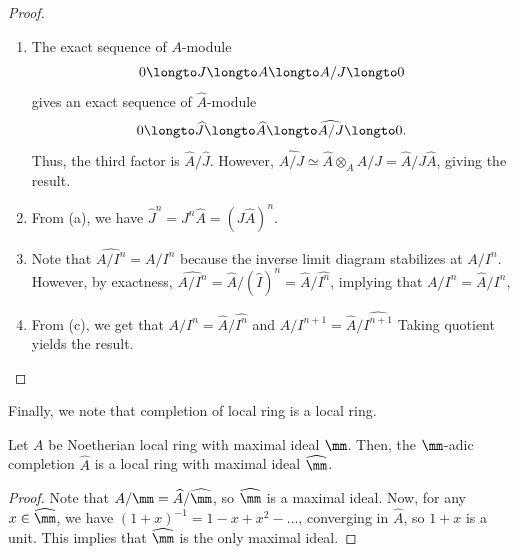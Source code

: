 \begin{proof}
    \begin{enumerate}[label=(\alph*)]
     \item The exact sequence of $A$-module
 	$$0\longto J\longto A\longto A/J\longto 0$$
 	gives an exact sequence of $\widehat A$-module
 	$$0\longto \widehat J\longto\widehat A
 	\longto\widehat{A/J} \longto 0.$$
 	Thus, the third factor is $\widehat A / \widehat J$.
        However, $\widehat{A/J} \simeq \widehat A\otimes_A A/J
        = \widehat A/J\widehat A$,
 	giving the result.
     \item From (a), we have $\widehat J^n = J^n\widehat A
 	= (J\widehat A)^n$.
     \item Note that $\widehat{A/I^n} = A/I^n$
     because the inverse limit diagram stabilizes at $A/I^n$.
     However, by exactness, 
     $\widehat{A/I^n} = \widehat A / (\widehat I)^n
     = \widehat A/\widehat{I^n}$,
     implying that $A/I^n = \widehat A/\widehat{I^n}$,
     \item From (c), we get that
      $A/I^n = \widehat A/\widehat{I^n}$
      and  $A/I^{n+1} = \widehat A/\widehat{I^{n+1}}$
     Taking quotient yields the result.
     \qedhere
     \end{enumerate}
\end{proof}
Finally, we note that completion of local ring is a local ring.
\begin{proposition}
    \label{prop:completion_local}
    Let $A$ be Noetherian local ring with maximal ideal $\mm$.
    Then, the $\mm$-adic completion $\widehat A$
    is a local ring with maximal ideal $\widehat \mm$.
\end{proposition}
\begin{proof}
    Note that $A/\mm = \widehat A/\widehat\mm$,
    so $\widehat\mm$ is a maximal ideal.
    Now, for any $x\in \widehat \mm$,
    we have $(1+x)^{-1} = 1-x+x^2-\dots$,
    converging in $\widehat A$, so $1+x$ is a unit.
    This implies that $\widehat \mm$ is the only maximal ideal.
\end{proof}

